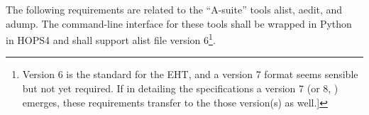The following requirements are related to the ``A-suite'' tools \acs{alist}, \acs{aedit},
and \acs{adump}.  The command-line interface for these tools shall be wrapped
in Python in HOPS4 and shall support alist file version 6\footnote{Version 6 is the standard for the \ac{EHT}, and a version 7 format seems
sensible but not yet required.  If in detailing the specifications
a version 7 (or 8, \etc) emerges, these requirements transfer
to the those version(s) as well.]}.




